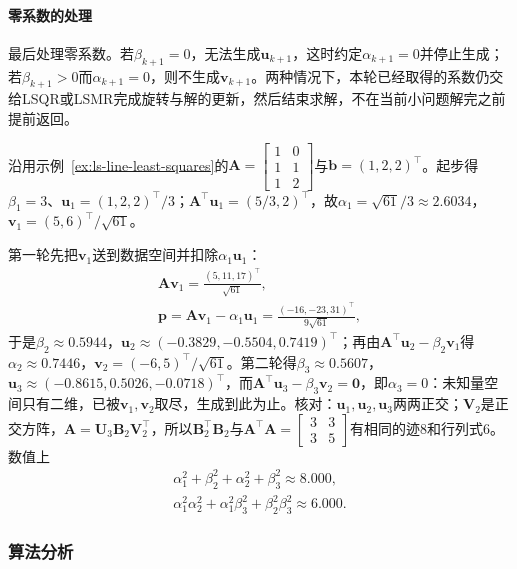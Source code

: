 \paragraph{零系数的处理}
最后处理零系数。若$\beta_{k+1}=0$，无法生成$\bm u_{k+1}$，这时约定$\alpha_{k+1}=0$并停止生成；若$\beta_{k+1}>0$而$\alpha_{k+1}=0$，则不生成$\bm v_{k+1}$。两种情况下，本轮已经取得的系数仍交给LSQR或LSMR完成旋转与解的更新，然后结束求解，不在当前小问题解完之前提前返回。

\begin{example}[直线拟合上的两步双对角化]
\label{ex:ls-golub-kahan-line}
沿用示例~\ref{ex:ls-line-least-squares}的$\bm A=\left[\begin{smallmatrix}1&0\\1&1\\1&2\end{smallmatrix}\right]$与$\bm b=(1,2,2)^\top$。起步得$\beta_1=3$、$\bm u_1=(1,2,2)^\top/3$；$\bm A^\top\bm u_1=(5/3,2)^\top$，故$\alpha_1=\sqrt{61}/3\approx2.6034$，$\bm v_1=(5,6)^\top/\sqrt{61}$。

第一轮先把$\bm v_1$送到数据空间并扣除$\alpha_1\bm u_1$：
\[
 \begin{gathered}
 \bm A\bm v_1=\frac{(5,11,17)^\top}{\sqrt{61}},\\
 \bm p=\bm A\bm v_1-\alpha_1\bm u_1=\frac{(-16,-23,31)^\top}{9\sqrt{61}},
 \end{gathered}
\]
于是$\beta_2\approx0.5944$，$\bm u_2\approx(-0.3829,-0.5504,0.7419)^\top$；再由$\bm A^\top\bm u_2-\beta_2\bm v_1$得$\alpha_2\approx0.7446$，$\bm v_2=(-6,5)^\top/\sqrt{61}$。第二轮得$\beta_3\approx0.5607$，$\bm u_3\approx(-0.8615,0.5026,-0.0718)^\top$，而$\bm A^\top\bm u_3-\beta_3\bm v_2=\bm0$，即$\alpha_3=0$：未知量空间只有二维，已被$\bm v_1,\bm v_2$取尽，生成到此为止。核对：$\bm u_1,\bm u_2,\bm u_3$两两正交；$\bm V_2$是正交方阵，$\bm A=\bm U_3\bm B_2\bm V_2^\top$，所以$\bm B_2^\top\bm B_2$与$\bm A^\top\bm A=\left[\begin{smallmatrix}3&3\\3&5\end{smallmatrix}\right]$有相同的迹$8$和行列式$6$。数值上
\[
 \begin{gathered}
 \alpha_1^2+\beta_2^2+\alpha_2^2+\beta_3^2\approx8.000,\\
 \alpha_1^2\alpha_2^2+\alpha_1^2\beta_3^2+\beta_2^2\beta_3^2\approx6.000 .
 \end{gathered}
\]
\end{example}

\subsubsection{算法分析}

